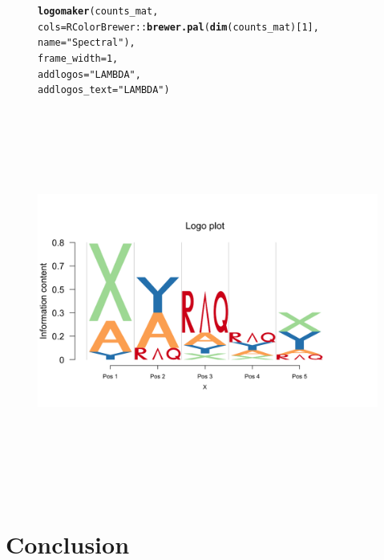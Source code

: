 \documentclass[12pt]{article}\usepackage[]{graphicx}\usepackage[usenames,dvipsnames]{color}
\makeatletter
\newcommand{\hlnum}[1]{\textcolor[rgb]{0.686,0.059,0.569}{#1}}%
\newcommand{\hlstr}[1]{\textcolor[rgb]{0.192,0.494,0.8}{#1}}%
\newcommand{\hlopt}[1]{\textcolor[rgb]{0,0,0}{#1}}%
\newcommand{\hlstd}[1]{\textcolor[rgb]{0.345,0.345,0.345}{#1}}%
\newcommand{\hlkwc}[1]{\textcolor[rgb]{0.333,0.667,0.333}{#1}}%
\newcommand{\hlkwd}[1]{\textcolor[rgb]{0.737,0.353,0.396}{\textbf{#1}}}%
\newenvironment{kframe}{%
 \def\at@end@of@kframe{}%
 \ifinner\ifhmode%
  \def\at@end@of@kframe{\end{minipage}}%
  \begin{minipage}{\columnwidth}%
 \fi\fi%
 \def\FrameCommand##1{\hskip\@totalleftmargin \hskip-\fboxsep
 \colorbox{shadecolor}{##1}\hskip-\fboxsep
     \hskip-\linewidth \hskip-\@totalleftmargin \hskip\columnwidth}%
 \MakeFramed {\advance\hsize-\width
   \@totalleftmargin\z@ \linewidth\hsize
   \@setminipage}}%
 {\par\unskip\endMakeFramed%
 \at@end@of@kframe}
\newenvironment{knitrout}{}{} %
\makeatother
\begin{document}
\begin{figure}[h]
\begin{center}
\begin{knitrout}
\color{fgcolor}\begin{kframe}
\begin{alltt}
\hlkwd{logomaker}\hlstd{(counts_mat,}
          \hlkwc{cols}\hlstd{= RColorBrewer}\hlopt{::}\hlkwd{brewer.pal}\hlstd{(}\hlkwd{dim}\hlstd{(counts_mat)[}\hlnum{1}\hlstd{],}
          \hlkwc{name} \hlstd{=} \hlstr{"Spectral"}\hlstd{),}
          \hlkwc{frame_width} \hlstd{=} \hlnum{1}\hlstd{,}
          \hlkwc{addlogos}\hlstd{=}\hlstr{"LAMBDA"}\hlstd{,}
          \hlkwc{addlogos_text}\hlstd{=}\hlstr{"LAMBDA"}\hlstd{)}
\end{alltt}
\end{kframe}
\includegraphics[width=8in,height=5in]{figure/logolas_use_17-1} 

\end{knitrout}
\end{center}
\end{figure}

\newpage

\section{Conclusion}
\end{document}
